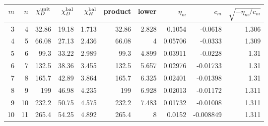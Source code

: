 \begin{tabular}{rrrrrrrrrr}
\toprule
$m$&$n$&$\chi_D^{\rm unit}$&$\chi_D^{\rm bal}$&$\chi_H^{\rm bal}$&product&lower&$\eta_m$&$c_m$&$\sqrt{-\eta_m/c_m}$\\
\midrule
3&4&32.86&19.18&1.713&32.86&2.828&0.1054&-0.0618&1.306\\
4&5&66.08&27.13&2.436&66.08&4&0.05706&-0.0333&1.309\\
5&6&99.3&33.22&2.989&99.3&4.899&0.03911&-0.0228&1.31\\
6&7&132.5&38.36&3.455&132.5&5.657&0.02976&-0.01733&1.31\\
7&8&165.7&42.89&3.864&165.7&6.325&0.02401&-0.01398&1.31\\
8&9&199&46.98&4.235&199&6.928&0.02013&-0.01172&1.311\\
9&10&232.2&50.75&4.575&232.2&7.483&0.01732&-0.01008&1.311\\
10&11&265.4&54.25&4.892&265.4&8&0.0152&-0.008849&1.311\\
\bottomrule
\end{tabular}
